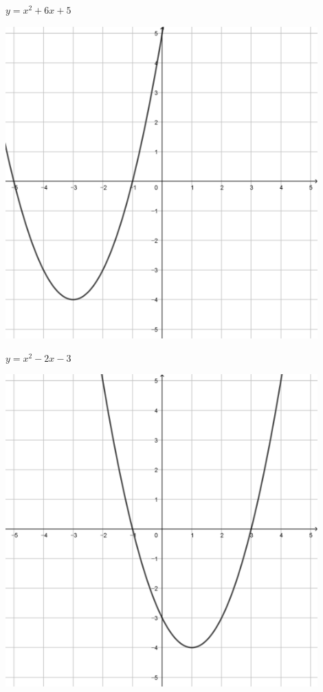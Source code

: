 \documentclass[a4paper]{oblivoir}
\begin{document}
\begin{minipage}{0.45\textwidth}\centering
\(y=x^2+6x+5\)
\par\bigskip\includegraphics[width=0.9\textwidth]{img/2_quadratic_25}
\end{minipage}
\begin{minipage}{0.45\textwidth}\centering
\(y=x^2-2x-3\)
\par\bigskip\includegraphics[width=0.9\textwidth]{img/2_quadratic_26}
\end{minipage}\bigskip\bigskip\par
\end{document}
